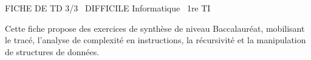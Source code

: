 \documentclass[11pt]{article}
\begin{document}
\begin{tcolorbox}[enhanced,colback=popink,colframe=popink,arc=10pt,boxrule=0pt,left=12pt,right=12pt,top=9pt,bottom=9pt]
{\color{white}\popxbold\small FICHE DE TD 3/3 \textbullet\ DIFFICILE \hfill Informatique \textbullet\ 1re TI\par}
\end{tcolorbox}
\vspace{4pt}
Cette fiche propose des exercices de synthèse de niveau Baccalauréat, mobilisant le tracé, l'analyse de complexité en instructions, la récursivité et la manipulation de structures de données.
\end{document}
